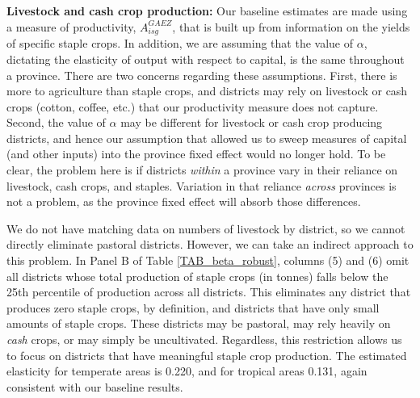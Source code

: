 \documentclass[11pt]{article}
\begin{document}
\vspace{.5cm}\noindent\textbf{Livestock and cash crop production:} Our baseline estimates are made using a measure of productivity, $A^{GAEZ}_{isg}$, that is built up from information on the yields of specific staple crops. In addition, we are assuming that the value of $\alpha$, dictating the elasticity of output with respect to capital, is the same throughout a province. There are two concerns regarding these assumptions. First, there is more to agriculture than staple crops, and districts may rely on livestock or cash crops (cotton, coffee, etc.) that our productivity measure does not capture. Second, the value of $\alpha$ may be different for livestock or cash crop producing districts, and hence our assumption that allowed us to sweep measures of capital (and other inputs) into the province fixed effect would no longer hold. To be clear, the problem here is if districts \textit{within} a province vary in their reliance on livestock, cash crops, and staples. Variation in that reliance \textit{across} provinces is not a problem, as the province fixed effect will absorb those differences.

We do not have matching data on numbers of livestock by district, so we cannot directly eliminate pastoral districts. However, we can take an indirect approach to this problem. In Panel B of Table \ref{TAB_beta_robust}, columns (5) and (6) omit all districts whose total production of staple crops (in tonnes) falls below the 25th percentile of production across all districts. This eliminates any district that produces zero staple crops, by definition, and districts that have only small amounts of staple crops. These districts may be pastoral, may rely heavily on \textit{cash} crops, or may simply be uncultivated. Regardless, this restriction allows us to focus on districts that have meaningful staple crop production. The estimated elasticity for temperate areas is 0.220, and for tropical areas 0.131, again consistent with our baseline results. 
\end{document}
